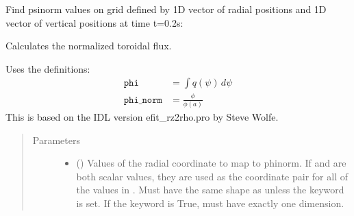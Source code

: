 \documentclass[letterpaper,10pt,english]{sphinxmanual}
\begin{document}
\begin{fulllineitems}
\begin{fulllineitems}
\begin{sphinxVerbatim}[commandchars=\\\{\}]
  \PYG{p}{[} \PYG{p}{]} \PYG{p}{[} \PYG{p}{]} \PYG{p}{[} \PYG{p}{]} 
\end{sphinxVerbatim}

Find psinorm values on grid defined by 1D vector of radial positions 
and 1D vector of vertical positions  at time t=0.2s:

\begin{sphinxVerbatim}[commandchars=\\\{\}]
     
\end{sphinxVerbatim}

\end{fulllineitems}


\begin{fulllineitems}
\label{\detokenize{eqtools:eqtools.core.Equilibrium.rz2phinorm}}
Calculates the normalized toroidal flux.

Uses the definitions:
\begin{equation*}
\begin{split}\texttt{phi} &= \int q(\psi)\,d\psi\\
\texttt{phi\_norm} &= \frac{\phi}{\phi(a)}\end{split}
\end{equation*}
This is based on the IDL version efit\_rz2rho.pro by Steve Wolfe.
\begin{quote}\begin{description}
\item[{Parameters}] \leavevmode\begin{itemize}
\item {} 
 () \textendash{} Values of the radial coordinate to
map to phinorm. If  and  are both scalar values,
they are used as the coordinate pair for all of the values in
. Must have the same shape as  unless the 
keyword is set. If the  keyword is True,  must
have exactly one dimension.


\end{itemize}
\end{description}
\end{quote}
\end{fulllineitems}
\end{fulllineitems}
\end{document}
